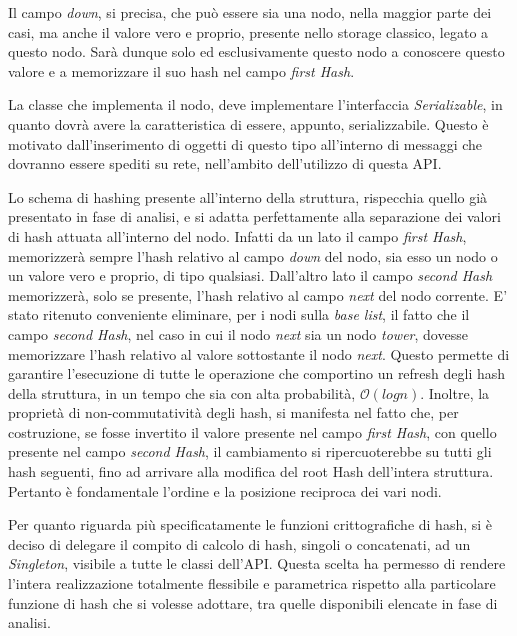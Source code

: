 	Il campo \textit{down}, si precisa, che può essere sia una nodo, nella maggior parte dei casi, ma anche il valore vero e proprio, presente nello storage classico, legato a questo nodo. Sarà dunque solo ed esclusivamente questo nodo a conoscere questo valore e a memorizzare il suo hash nel campo \textit{first Hash}.
	
	La classe che implementa il nodo, deve implementare l'interfaccia \textit{Serializable}, in quanto dovrà avere la caratteristica di essere, appunto, serializzabile. Questo è motivato dall'inserimento di oggetti di questo tipo all'interno di messaggi che dovranno essere spediti su rete, nell'ambito dell'utilizzo di questa API.
	
	Lo schema di hashing presente all'interno della struttura, rispecchia quello già presentato in fase di analisi, e si adatta perfettamente alla separazione dei valori di hash attuata all'interno del nodo. Infatti da un lato il campo \textit{first Hash}, memorizzerà sempre l'hash relativo al campo \textit{down} del nodo, sia esso un nodo o un valore vero e proprio, di tipo qualsiasi. Dall'altro lato il campo \textit{second Hash} memorizzerà, solo se presente, l'hash relativo al campo \textit{next} del nodo corrente. 
	E' stato ritenuto conveniente eliminare, per i nodi sulla \textit{base list}, il fatto che il campo \textit{second Hash}, nel caso in cui il nodo \textit{next} sia un nodo \textit{tower}, dovesse memorizzare l'hash relativo al valore sottostante il nodo \textit{next}. Questo permette di garantire l'esecuzione di tutte le operazione che comportino un refresh degli hash della struttura, in un tempo che sia con alta probabilità, $\mathcal{O}(log{}n)$.
	Inoltre, la proprietà di non-commutatività degli hash, si manifesta nel fatto che, per costruzione, se fosse invertito il valore presente nel campo \textit{first Hash}, con quello presente nel campo \textit{second Hash}, il cambiamento si ripercuoterebbe su tutti gli hash seguenti, fino ad arrivare alla modifica del root Hash dell'intera struttura. Pertanto è fondamentale l'ordine e la posizione reciproca dei vari nodi.
	
	Per quanto riguarda più specificatamente le funzioni crittografiche di hash, si è deciso di delegare il compito di calcolo di hash, singoli o concatenati, ad un \textit{Singleton}, visibile a tutte le classi dell'API. Questa scelta ha permesso di rendere l'intera realizzazione totalmente flessibile e parametrica rispetto alla particolare funzione di hash che si volesse adottare, tra quelle disponibili elencate in fase di analisi.
	

